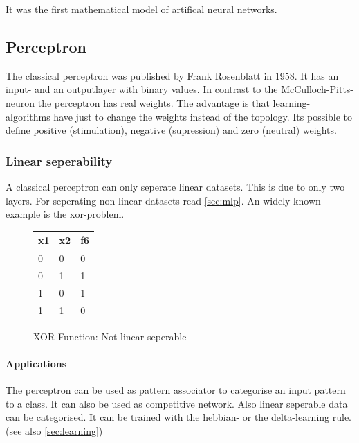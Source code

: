 \documentclass[10pt,a4paper,DIV=11]{scrreprt}
\begin{document}
It was the first mathematical model of artifical neural networks.\cite{NEURONMATH}


\subsection{Perceptron}
The classical perceptron was published by Frank Rosenblatt in 1958.
It has an input- and an outputlayer with binary values. In contrast to the McCulloch-Pitts-neuron
the perceptron has real weights. The advantage is that learning-algorithms have just to change the weights instead of the topology. Its possible to define positive (stimulation), negative (supression) and zero (neutral) weights.

\subsubsection*{Linear seperability}
A classical perceptron can only seperate linear datasets. This is due to only two layers. For seperating non-linear datasets read \ref{sec:mlp}.
An widely known example is the xor-problem.

\begin{figure}[H]
	\centering
	\begin{tabular}{|l|l|l|}
		\hline
		x1 & x2 & f6\\
		\hline
		0 & 0 & 0 \\
		\hline
		0 & 1 & 1 \\
		\hline
		1 & 0 & 1 \\
		\hline
		1 & 1 & 0 \\
		\hline
	\end{tabular}
	\caption{XOR-Function: Not linear seperable}
	\label{fig:linsep1}
	
	
\end{figure}

\paragraph{Applications}
The perceptron can be used as pattern associator to categorise an input pattern to a class. It can also be used as competitive network. Also linear seperable data can be categorised.
It can be trained with the hebbian- or the delta-learning rule.(see also \eqref{sec:learning})
\end{document}

